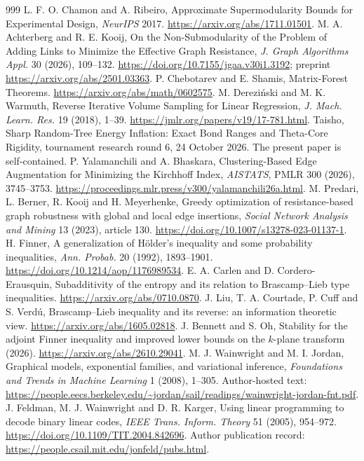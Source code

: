 \documentclass[11pt,a4paper]{article}
\theoremstyle{definition}\newtheorem{definition}[theorem]{Definition}
\theoremstyle{remark}\newtheorem{remark}[theorem]{Remark}
\numberwithin{equation}{section}
\begin{document}
\begin{thebibliography}{999}
 L. F. O. Chamon and A. Ribeiro, Approximate Supermodularity Bounds for Experimental Design, \emph{NeurIPS} 2017. \url{https://arxiv.org/abs/1711.01501}.
 M. A. Achterberg and R. E. Kooij, On the Non-Submodularity of the Problem of Adding Links to Minimize the Effective Graph Resistance, \emph{J. Graph Algorithms Appl.} 30 (2026), 109--132. \url{https://doi.org/10.7155/jgaa.v30i1.3192}; preprint \url{https://arxiv.org/abs/2501.03363}.
 P. Chebotarev and E. Shamis, Matrix-Forest Theorems. \url{https://arxiv.org/abs/math/0602575}.
 M. Derezi\'nski and M. K. Warmuth, Reverse Iterative Volume Sampling for Linear Regression, \emph{J. Mach. Learn. Res.} 19 (2018), 1--39. \url{https://jmlr.org/papers/v19/17-781.html}.
 Taisho, Sharp Random-Tree Energy Inflation: Exact Bond Ranges and Theta-Core Rigidity, tournament research round 6, 24 October 2026. The present paper is self-contained.
 P. Yalamanchili and A. Bhaskara, Clustering-Based Edge Augmentation for Minimizing the Kirchhoff Index, \emph{AISTATS}, PMLR 300 (2026), 3745--3753. \url{https://proceedings.mlr.press/v300/yalamanchili26a.html}.
 M. Predari, L. Berner, R. Kooij and H. Meyerhenke, Greedy optimization of resistance-based graph robustness with global and local edge insertions, \emph{Social Network Analysis and Mining} 13 (2023), article 130. \url{https://doi.org/10.1007/s13278-023-01137-1}.
 H. Finner, A generalization of H\"older's inequality and some probability inequalities, \emph{Ann. Probab.} 20 (1992), 1893--1901. \url{https://doi.org/10.1214/aop/1176989534}.
 E. A. Carlen and D. Cordero-Erausquin, Subadditivity of the entropy and its relation to Brascamp--Lieb type inequalities. \url{https://arxiv.org/abs/0710.0870}.
 J. Liu, T. A. Courtade, P. Cuff and S. Verd\'u, Brascamp--Lieb inequality and its reverse: an information theoretic view. \url{https://arxiv.org/abs/1605.02818}.
 J. Bennett and S. Oh, Stability for the adjoint Finner inequality and improved lower bounds on the $k$-plane transform (2026). \url{https://arxiv.org/abs/2610.29041}.
 M. J. Wainwright and M. I. Jordan, Graphical models, exponential families, and variational inference, \emph{Foundations and Trends in Machine Learning} 1 (2008), 1--305. Author-hosted text: \url{https://people.eecs.berkeley.edu/~jordan/sail/readings/wainwright-jordan-fnt.pdf}.
 J. Feldman, M. J. Wainwright and D. R. Karger, Using linear programming to decode binary linear codes, \emph{IEEE Trans. Inform. Theory} 51 (2005), 954--972. \url{https://doi.org/10.1109/TIT.2004.842696}. Author publication record: \url{https://people.csail.mit.edu/jonfeld/pubs.html}.

\end{thebibliography}
\end{document}
